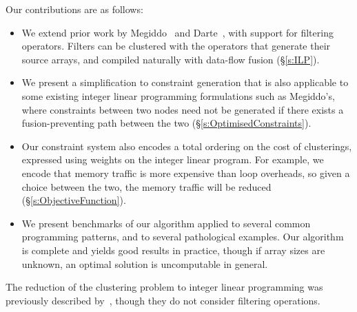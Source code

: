 Our contributions are as follows:
\begin{itemize}
\item   
We extend prior work by Megiddo~\cite{megiddo1998optimal} and Darte~\cite{darte2002contraction}, with support for filtering operators. Filters can be clustered with the operators that generate their source arrays, and compiled naturally with data-flow fusion (\S\ref{s:ILP}).

\item
We present a simplification to constraint generation that is also applicable to some existing integer linear programming formulations such as Megiddo's,
where constraints between two nodes need not be generated if there exists a fusion-preventing path between the two (\S\ref{s:OptimisedConstraints}).

\item
Our constraint system also encodes a total ordering on the cost of clusterings, expressed using weights on the integer linear program. For example, we encode that memory traffic is more expensive than loop overheads, so given a choice between the two, the memory traffic will be reduced (\S\ref{s:ObjectiveFunction}).

\item
We present benchmarks of our algorithm applied to several common programming patterns, and to several pathological examples.
Our algorithm is complete and yields good results in practice, though if array sizes are unknown, an optimal solution is uncomputable in general. 
\end{itemize}

The reduction of the clustering problem to integer linear programming was previously described by~\cite{megiddo1998optimal}, though they do not consider filtering operations.




